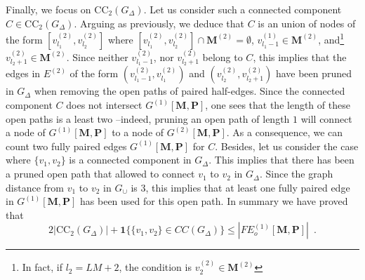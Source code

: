 \documentclass{article}
\begin{document}
Finally, we focus on $\mathrm{CC}_{2}(G_{\Delta})$. Let us consider such a connected component $C\in \mathrm{CC}_{2}(G_{\Delta})$. Arguing as previously, we deduce that  $C$ is an union of nodes of the form $[v^{(2)}_{l_1},v^{(2)}_{l_2}]$ where $[v^{(2)}_{l_1},v^{(2)}_{l_2}]\cap \mathbf{M}^{(2)}=\emptyset$, $v^{(1)}_{l_1-1}\in \mathbf{M}^{(2)}$, and\footnote{In fact, if  $l_2=LM+2$, the condition is $v^{(2)}_2\in \mathbf{M}^{(2)}$} $v^{(2)}_{l_2+1}\in \mathbf{M}^{(2)}$. Since neither $v^{(2)}_{l_1-1}$, nor $v^{(2)}_{l_2+1}$ belong to $C$, this implies that the edges in $E^{(2)}$ of the form $(v^{(2)}_{l_1-1},v^{(2)}_{l_1})$ and $(v^{(2)}_{l_2},v^{(2)}_{l_2+1})$ have been pruned in $G_{\Delta}$ when removing the open paths of paired half-edges. Since the connected component $C$ does not intersect $G^{(1)}[\mathbf{M},\mathbf{P}]$, one sees that the length of these open paths is a least two --indeed, pruning an open path of length $1$ will connect a node of $G^{(1)}[\mathbf{M},\mathbf{P}]$ to a node of $G^{(2)}[\mathbf{M},\mathbf{P}]$. 
As a consequence, we can count two fully paired edges $G^{(1)}[\mathbf{M},\mathbf{P}]$ for $C$. Besides, let us consider the case where $\{v_1,v_2\}$ is a connected component in $G_{\Delta}$. This implies that there has been a pruned open path that allowed to connect $v_1$ to $v_2$ in $G_{\Delta}$. Since the graph distance from $v_1$ to $v_2$ in $G_{\cup}$ is $3$, this implies that at least one fully paired edge in $G^{(1)}[\mathbf{M},\mathbf{P}]$ has been used for this open path. In summary we have proved that
\begin{equation}\label{eq:upper_CC_2}
  2|\mathrm{CC}_{2}(G_{\Delta})|+ \mathbf{1}\{\{v_1,v_2\}\in CC(G_{\Delta})\}\leq   |FE_o^{(1)}[\mathbf{M},\mathbf{P}]|\enspace .
\end{equation}
\end{document}
